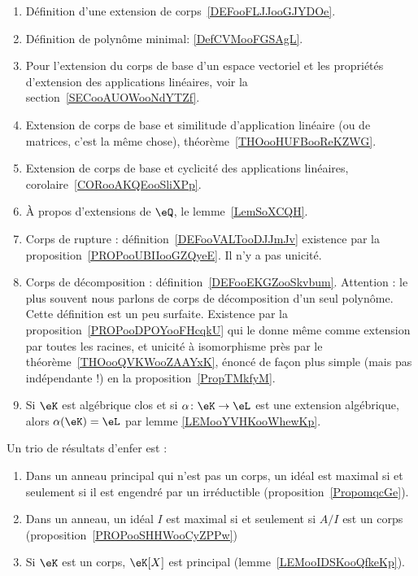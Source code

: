  \label{THEMEooZYKFooQXhiPD}
    \begin{enumerate}
        \item
            Définition d'une extension de corps~\ref{DEFooFLJJooGJYDOe}.
        \item
            Définition de polynôme minimal: \ref{DefCVMooFGSAgL}.
        \item
            Pour l'extension du corps de base d'un espace vectoriel et les propriétés d'extension des applications linéaires, voir la section~\ref{SECooAUOWooNdYTZf}.
        \item
            Extension de corps de base et similitude d'application linéaire (ou de matrices, c'est la même chose), théorème~\ref{THOooHUFBooReKZWG}.
        \item
            Extension de corps de base et cyclicité des applications linéaires, corolaire~\ref{CORooAKQEooSliXPp}.
        \item
            À propos d'extensions de \( \eQ\), le lemme~\ref{LemSoXCQH}.
        \item
            Corps de rupture : définition~\ref{DEFooVALTooDJJmJv} existence par la proposition~\ref{PROPooUBIIooGZQyeE}. Il n'y a pas unicité.
        \item
            Corps de décomposition : définition~\ref{DEFooEKGZooSkvbum}. Attention : le plus souvent nous parlons de corps de décomposition d'un seul polynôme. Cette définition est un peu surfaite. Existence par la proposition~\ref{PROPooDPOYooFHcqkU} qui le donne même comme extension par toutes les racines, et unicité à isomorphisme près par le théorème~\ref{THOooQVKWooZAAYxK}, énoncé de façon plus simple (mais pas indépendante !) en la proposition~\ref{PropTMkfyM}.
        \item
            Si \( \eK\) est algébrique clos et si \( \alpha\colon \eK\to \eL\) est une extension algébrique, alors \( \alpha(\eK)=\eL\) par lemme \ref{LEMooYVHKooWhewKp}.
    \end{enumerate}

Un trio de résultats d'enfer est :
\begin{enumerate}
    \item
        Dans un anneau principal qui n'est pas un corps, un idéal est maximal si et seulement si il est engendré par un irréductible (proposition~\ref{PropomqcGe}).
    \item
        Dans un anneau, un idéal \( I\) est maximal si et seulement si \( A/I\) est un corps (proposition~\ref{PROPooSHHWooCyZPPw})
    \item
        Si \( \eK\) est un corps, \( \eK[X]\) est principal (lemme~\ref{LEMooIDSKooQfkeKp}).
\end{enumerate}


